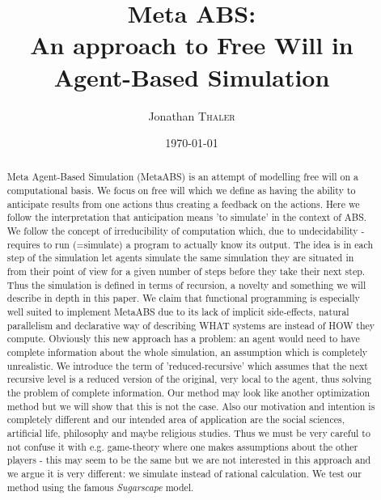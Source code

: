 \documentclass{article}
\title{Meta ABS: \\ An approach to Free Will in Agent-Based Simulation} %
\author{Jonathan \textsc{Thaler}} %
\date{\today} %
\begin{document}
\maketitle %

\begin{abstract}
Meta Agent-Based Simulation (MetaABS) is an attempt of modelling free will on a computational basis. We focus on free will which we define as having the ability to anticipate results from one actions thus creating a feedback on the actions. Here we follow the interpretation that anticipation means 'to simulate' in the context of ABS. We follow the concept of irreducibility of computation which, due to undecidability - requires to run (=simulate) a program to actually know its output. The idea is in each step of the simulation let agents simulate the same simulation they are situated in from their point of view for a given number of steps before they take their next step. Thus the simulation is defined in terms of recursion, a novelty and something we will describe in depth in this paper. We claim that functional programming is especially well suited to implement MetaABS due to its lack of implicit side-effects, natural parallelism and declarative way of describing WHAT systems are instead of HOW they compute. Obviously this new approach has a problem: an agent would need to have complete information about the whole simulation, an assumption which is completely unrealistic. We introduce the term of 'reduced-recursive' which assumes that the next recursive level is a reduced version of the original, very local to the agent, thus solving the problem of complete information.
Our method may look like another optimization method but we will show that this is not the case. Also our motivation and intention is completely different and our intended area of application are the social sciences, artificial life, philosophy and maybe religious studies. Thus we must be very careful to not confuse it with e.g. game-theory where one makes assumptions about the other players - this may seem to be the same but we are not interested in this approach and we argue it is very different: we simulate instead of rational calculation. We test our method using the famous \textit{Sugarscape} model.
\end{abstract}



\end{document}

